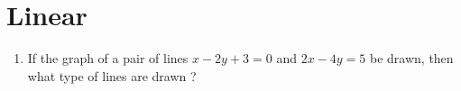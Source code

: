 \documentclass{article}
\begin{document}
\section*{\center Linear}
\begin{enumerate}
    \item If the graph of a pair of lines $x-2y+3=0$ and $2x-4y=5$ be drawn, then what type of lines are drawn ?
\end{enumerate}
\end{document}
